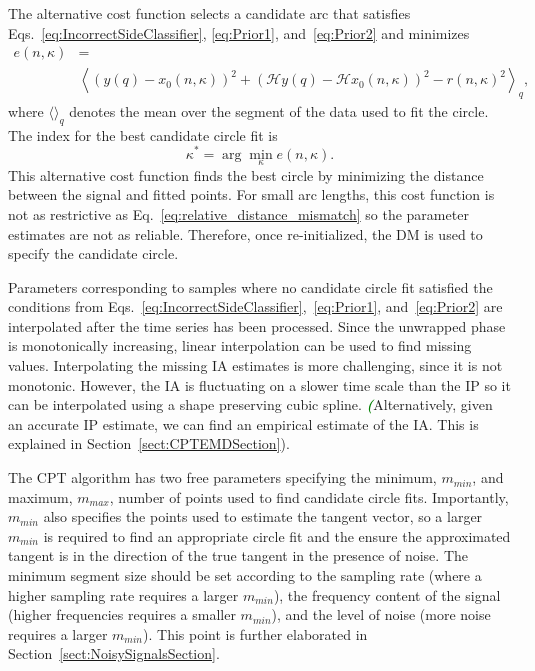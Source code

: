 \documentclass[journal,11pt,a4paper,onecolumn,draftcls]{IEEEtran}
\newcommand{\dean}[1]{\textsf{\emph{\textbf{\textcolor{green}{#1}}}}}
\begin{document}
The alternative cost function selects a candidate arc that satisfies Eqs.~\ref{eq:IncorrectSideClassifier}, \ref{eq:Prior1}, and~\ref{eq:Prior2} and minimizes
\begin{align}\label{BestCircFit2Reinitialize}
e\left( {n,\kappa} \right) &=  \\ \nonumber
 &\left\langle \left( y(q) - x_0\left( n,\kappa \right) \right)^2 + \left( \mathcal{H}y(q) - \mathcal{H}x_0\left( n,\kappa \right) \right)^2 - r\left( n,\kappa \right)^2 \right\rangle_q,
\end{align}
where $\langle\rangle_q$ denotes the mean over the segment of the data used to fit the circle. The index for the best candidate circle fit is
\begin{equation}\label{ReinitBestIndex}
\kappa^ * = \arg \mathop {\min }\limits_\kappa e\left( {n,\kappa} \right).
\end{equation}
This alternative cost function finds the best circle by minimizing the distance between the signal and fitted points. For small arc lengths, this cost function is not as restrictive as Eq.~\ref{eq:relative_distance_mismatch} so the parameter estimates are not as reliable. Therefore, once re-initialized, the DM is used to specify the candidate circle. %

Parameters corresponding to samples where no candidate circle fit satisfied the conditions from Eqs.~\ref{eq:IncorrectSideClassifier},~\ref{eq:Prior1}, and~\ref{eq:Prior2} are interpolated after the time series has been processed. Since the unwrapped phase is monotonically increasing, linear interpolation can be used to find missing values. Interpolating the missing IA estimates is more challenging, since it is not monotonic. However, the IA is fluctuating on a slower time scale than the IP so it can be interpolated using a shape preserving cubic spline. \dean(Alternatively, given an accurate IP estimate, we can find an empirical estimate of the IA. This is explained in Section~\ref{sect:CPTEMDSection}). 

The CPT algorithm has two free parameters specifying the minimum, $m_{min}$, and maximum, $m_{max}$, number of points used to find candidate circle fits. Importantly, $m_{min}$ also specifies the points used to estimate the tangent vector, so a larger $m_{min}$ is required to find an appropriate circle fit and the ensure the approximated tangent is in the direction of the true tangent in the presence of noise. The minimum segment size should be set according to the sampling rate (where a higher sampling rate requires a larger $m_{min}$), the frequency content of the signal (higher frequencies requires a smaller $m_{min}$), and the level of noise (more noise requires a larger $m_{min}$).  This point is further elaborated in Section~\ref{sect:NoisySignalsSection}. 
\end{document}
